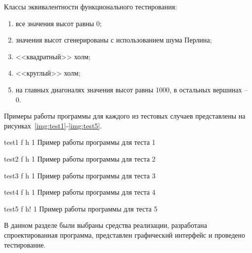 Классы эквивалентности функционального тестирования:

\begin{enumerate}
	\item все значения высот равны 0;
	\item значения высот сгенерированы с использованием шума Перлина;
	\item <<квадратный>> холм;
	\item <<круглый>> холм;
	\item на главных диагоналях значения высот равны 1000, в остальных вершинах -- 0.
\end{enumerate}

Примеры работы программы для каждого из тестовых случаев представлены на рисунках~\ref{img:test1}-\ref{img:test5}.

\FloatBarrier
{}
{test1} %
{f} %
{h} %
{1\textwidth} %
{Пример работы программы для теста 1} %
\FloatBarrier

\FloatBarrier
{}
{test2} %
{f} %
{h} %
{1\textwidth} %
{Пример работы программы для теста 2} %
\FloatBarrier

\FloatBarrier
{}
{test3} %
{f} %
{h} %
{1\textwidth} %
{Пример работы программы для теста 3} %
\FloatBarrier

\FloatBarrier
{}
{test4} %
{f} %
{h} %
{1\textwidth} %
{Пример работы программы для теста 4} %
\FloatBarrier

\FloatBarrier
{}
{test5} %
{f} %
{h!} %
{1\textwidth} %
{Пример работы программы для теста 5} %
\FloatBarrier


В данном разделе были выбраны средства реализации, разработана спроектированная программа, представлен графический интерфейс и проведено тестирование.